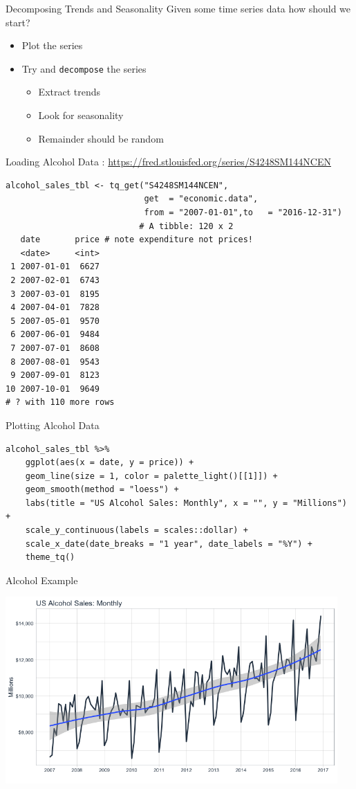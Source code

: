 \documentclass[aspectratio=169]{beamer}
\begin{document}
\begin{frame}{Decomposing Trends and Seasonality}
Given some time series data how should we start?
\begin{itemize}
\item Plot the series
\item Try and \texttt{decompose} the series
\begin{itemize}
\item Extract \alert{trends}
\item Look for \alert{seasonality}
\item Remainder should be \alert{random}
\end{itemize}
\end{itemize}
\end{frame}

\begin{frame}[fragile]{Loading Alcohol Data : }
\small
\url{https://fred.stlouisfed.org/series/S4248SM144NCEN}
\begin{verbatim}
alcohol_sales_tbl <- tq_get("S4248SM144NCEN", 
                            get  = "economic.data", 
                            from = "2007-01-01",to   = "2016-12-31")
                           # A tibble: 120 x 2
   date       price # note expenditure not prices!
   <date>     <int>
 1 2007-01-01  6627
 2 2007-02-01  6743
 3 2007-03-01  8195
 4 2007-04-01  7828
 5 2007-05-01  9570
 6 2007-06-01  9484
 7 2007-07-01  8608
 8 2007-08-01  9543
 9 2007-09-01  8123
10 2007-10-01  9649
# ? with 110 more rows
\end{verbatim}
\end{frame}

\begin{frame}[fragile]{Plotting Alcohol Data}
\small
\begin{verbatim}
alcohol_sales_tbl %>%
    ggplot(aes(x = date, y = price)) +
    geom_line(size = 1, color = palette_light()[[1]]) +
    geom_smooth(method = "loess") +
    labs(title = "US Alcohol Sales: Monthly", x = "", y = "Millions") +
    scale_y_continuous(labels = scales::dollar) +
    scale_x_date(date_breaks = "1 year", date_labels = "%Y") +
    theme_tq()
\end{verbatim}
\end{frame}

\begin{frame}{Alcohol Example}
\begin{center}
\includegraphics[width=5in]{./resources/alcohol.png}
\end{center}
\end{frame}
\end{document}
